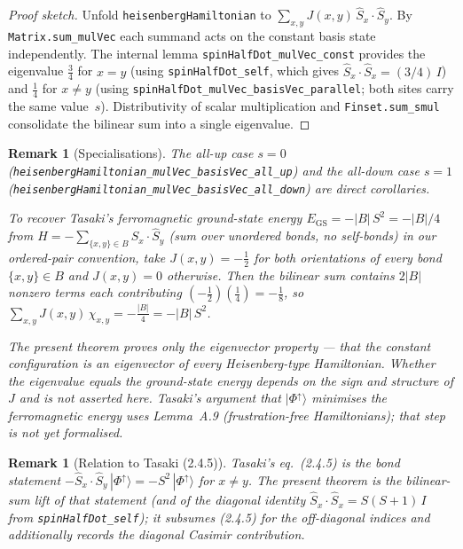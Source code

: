 \documentclass[a4paper,11pt]{article}
\newtheorem{remark}[theorem]{Remark}
\begin{document}
\begin{proof}[Proof sketch]
Unfold \texttt{heisenbergHamiltonian} to
$\sum_{x,y} J(x,y)\,\hat S_x\cdot\hat S_y$. By
\texttt{Matrix.sum\_mulVec} each summand acts on the constant basis
state independently. The internal lemma
\texttt{spinHalfDot\_mulVec\_const} provides the eigenvalue
$\tfrac{3}{4}$ for $x=y$ (using \texttt{spinHalfDot\_self}, which
gives $\hat S_x\cdot\hat S_x = (3/4)\,I$) and $\tfrac{1}{4}$ for
$x\ne y$ (using \texttt{spinHalfDot\_mulVec\_basisVec\_parallel};
both sites carry the same value~$s$). Distributivity of scalar
multiplication and \texttt{Finset.sum\_smul} consolidate the bilinear
sum into a single eigenvalue.
\end{proof}

\begin{remark}[Specialisations]
The all-up case $s=0$ (\texttt{heisenbergHamiltonian\_mulVec\_basisVec\_all\_up})
and the all-down case $s=1$
(\texttt{heisenbergHamiltonian\_mulVec\_basisVec\_all\_down}) are
direct corollaries.

To recover Tasaki's ferromagnetic ground-state energy
$E_{\mathrm{GS}}=-|B|\,S^{2}=-|B|/4$ from
$H = -\sum_{\{x,y\}\in B}\hat S_x\cdot\hat S_y$ (sum over unordered
bonds, no self-bonds) in our ordered-pair convention, take
$J(x,y)=-\tfrac{1}{2}$ for both orientations of every bond
$\{x,y\}\in B$ and $J(x,y)=0$ otherwise.  Then the bilinear sum
contains $2|B|$ nonzero terms each contributing
$(-\tfrac{1}{2})(\tfrac{1}{4})=-\tfrac{1}{8}$, so
$\sum_{x,y}J(x,y)\,\chi_{x,y}=-\tfrac{|B|}{4}=-|B|\,S^{2}$.

The present theorem proves only the \emph{eigenvector} property — that
the constant configuration is an eigenvector of every Heisenberg-type
Hamiltonian.  Whether the eigenvalue equals the ground-state energy
depends on the sign and structure of $J$ and is not asserted here.
Tasaki's argument that $|\Phi^{\uparrow}\rangle$ \emph{minimises} the
ferromagnetic energy uses Lemma~A.9 (frustration-free Hamiltonians);
that step is not yet formalised.
\end{remark}

\begin{remark}[Relation to Tasaki (2.4.5)]
Tasaki's eq.~(2.4.5) is the bond statement
$-\hat S_x\!\cdot\!\hat S_y\,|\Phi^{\uparrow}\rangle
   = -S^{2}\,|\Phi^{\uparrow}\rangle$ for $x\ne y$.  The present theorem
is the bilinear-sum lift of that statement (and of the diagonal
identity $\hat S_x\!\cdot\!\hat S_x = S(S+1)\,I$ from
\texttt{spinHalfDot\_self}); it subsumes (2.4.5) for the off-diagonal
indices and additionally records the diagonal Casimir contribution.
\end{remark}
\end{document}
